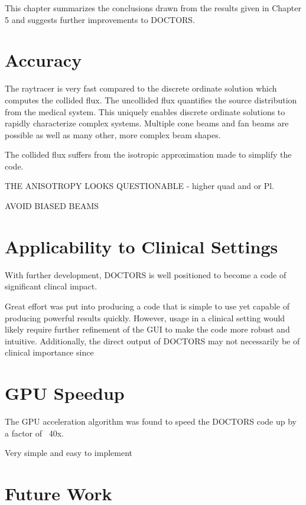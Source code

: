 
This chapter summarizes the conclusions drawn from the results given in Chapter 5 and suggests further improvements to DOCTORS.

\section{Accuracy}

The raytracer is very fast compared to the discrete ordinate solution which computes the collided flux. The uncollided flux quantifies the source distribution from the medical system. This uniquely enables discrete ordinate solutions to rapidly characterize complex systems. Multiple cone beams and fan beams are possible as well as many other, more complex beam shapes.

The collided flux suffers from the isotropic approximation made to simplify the code.

THE ANISOTROPY LOOKS QUESTIONABLE - higher quad and or Pl.

AVOID BIASED BEAMS

\section{Applicability to Clinical Settings}
With further development, DOCTORS is well positioned to become a code of significant clincal impact.

Great effort was put into producing a code that is simple to use yet capable of producing powerful results quickly. However, usage in a clinical setting would likely require further refinement of the GUI to make the code more robust and intuitive. Additionally, the direct output of DOCTORS may not necessarily be of clinical importance since 

\section{GPU Speedup}

The GPU acceleration algorithm was found to speed the DOCTORS code up by a factor of ~40x.

Very simple and easy to implement

\section{Future Work}


